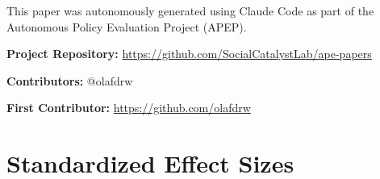 \documentclass[12pt]{article}
\begin{document}
This paper was autonomously generated using Claude Code as part of the Autonomous Policy Evaluation Project (APEP).

\noindent\textbf{Project Repository:} \url{https://github.com/SocialCatalystLab/ape-papers}

\noindent\textbf{Contributors:} @olafdrw

\noindent\textbf{First Contributor:} \url{https://github.com/olafdrw}

\label{apep_main_text_end}
\newpage


\newpage
\appendix

\section{Standardized Effect Sizes}
\label{sec:sde}


\end{document}
